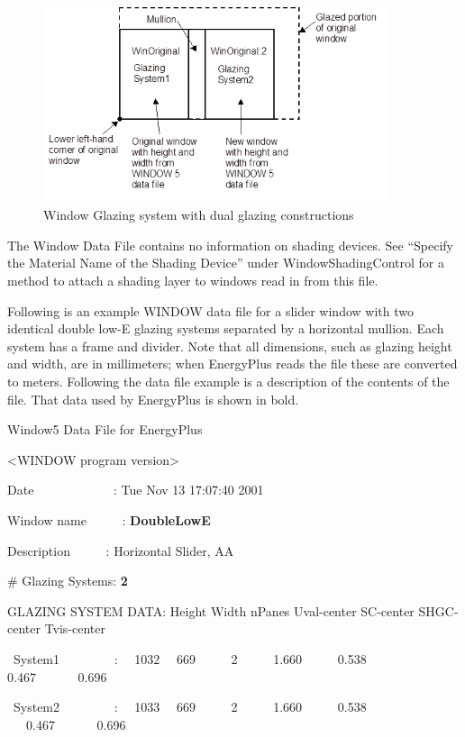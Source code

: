 \begin{figure}[hbtp] %
\centering
\includegraphics[width=0.9\textwidth, height=0.9\textheight, keepaspectratio=true]{media/image002.png}
\caption{Window Glazing system with dual glazing constructions \protect \label{fig:window-glazing-system-with-dual-glazing}}
\end{figure}

The Window Data File contains no information on shading devices. See ``Specify the Material Name of the Shading Device'' under WindowShadingControl for a method to attach a shading layer to windows read in from this file.

Following is an example WINDOW data file for a slider window with two identical double low-E glazing systems separated by a horizontal mullion. Each system has a frame and divider. Note that all dimensions, such as glazing height and width, are in millimeters; when EnergyPlus reads the file these are converted to meters. Following the data file example is a description of the contents of the file. That data used by EnergyPlus is shown in bold.

Window5 Data File for EnergyPlus

\textless{}WINDOW program version\textgreater{}

Date~~~~~~~~~~~~ : Tue Nov 13 17:07:40 2001

Window name~~~~~ : \textbf{DoubleLowE}

Description~~~~~ : Horizontal Slider, AA

\# Glazing Systems: \textbf{2}

GLAZING SYSTEM DATA: Height Width nPanes Uval-center SC-center SHGC-center Tvis-center

~System1~~~~~~~~ :~~ 1032~~ 669~~~~~ 2~~~~~ 1.660~~~~~ 0.538~~~~~ 0.467~~~~~~ 0.696

~System2~~~~~~~~ :~~ 1033~~ 669~~~~~ 2~~~~~ 1.660~~~~~ 0.538~~ ~~~0.467~~~~~~ 0.696

